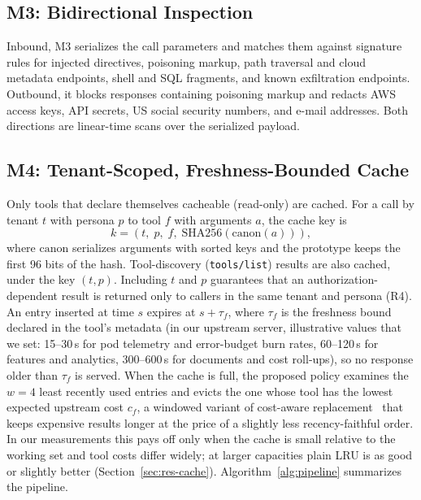\documentclass{ieeeaccess}
\begin{document}
\subsection{M3: Bidirectional Inspection}
Inbound, M3 serializes the call parameters and matches them against signature rules for injected directives, poisoning markup, path traversal and cloud metadata endpoints, shell and SQL fragments, and known exfiltration endpoints. Outbound, it blocks responses containing poisoning markup and redacts AWS access keys, API secrets, US social security numbers, and e-mail addresses. Both directions are linear-time scans over the serialized payload.

\subsection{M4: Tenant-Scoped, Freshness-Bounded Cache}
Only tools that declare themselves cacheable (read-only) are cached. For a call by tenant $t$ with persona $p$ to tool $f$ with arguments $a$, the cache key is
\begin{equation}
k = (t,\; p,\; f,\; \mathrm{SHA256}(\mathrm{canon}(a))),
\label{eq:key}
\end{equation}
where $\mathrm{canon}$ serializes arguments with sorted keys and the prototype keeps the first 96 bits of the hash. Tool-discovery (\texttt{tools/list}) results are also cached, under the key $(t, p)$. Including $t$ and $p$ guarantees that an authorization-dependent result is returned only to callers in the same tenant and persona (R4). An entry inserted at time $s$ expires at $s + \tau_f$, where $\tau_f$ is the freshness bound declared in the tool's metadata (in our upstream server, illustrative values that we set: 15--30\,s for pod telemetry and error-budget burn rates, 60--120\,s for features and analytics, 300--600\,s for documents and cost roll-ups), so no response older than $\tau_f$ is served. When the cache is full, the proposed policy examines the $w = 4$ least recently used entries and evicts the one whose tool has the lowest expected upstream cost $c_f$, a windowed variant of cost-aware replacement~\cite{cao1997cost} that keeps expensive results longer at the price of a slightly less recency-faithful order. In our measurements this pays off only when the cache is small relative to the working set and tool costs differ widely; at larger capacities plain LRU is as good or slightly better (Section~\ref{sec:res-cache}). Algorithm~\ref{alg:pipeline} summarizes the pipeline.
\end{document}

